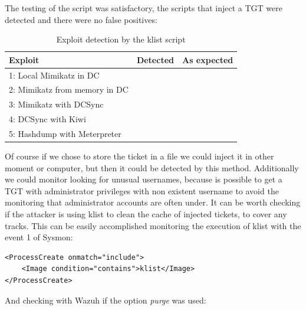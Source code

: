 \linej
\linej
The testing of the script was satisfactory, the scripts that inject a TGT were detected and there were no false positives:
\begin{table}[H]
	\centering
	\begin{tabular}{|l|l|l|}
		\hline
		\rowcolor{gray!30}
		Exploit & Detected & As expected \\ \hline
		1: Local Mimikatz in DC& \RYES& \RYES\\ \hline
		2: Mimikatz from memory in DC& \RYES& \RYES\\ \hline
		3: Mimikatz with DCSync& \RYES& \RYES\\ \hline
		4: DCSync with Kiwi& \RNO& \RYES\\ \hline
		5: Hashdump with Meterpreter& \RNO& \RYES\\ \hline
	\end{tabular}
	\caption{Exploit detection by the klist script}
\end{table}
Of course if we chose to store the ticket in a file we could inject it in other moment or computer, but then it could be detected by this method.
\linej
\linej
Additionally we could monitor looking for unusual usernames, because is possible to get a TGT with administrator privileges with non existent username to avoid the monitoring that administrator accounts are often under.
\linej
\linej
It can be worth checking if the attacker is using klist to clean the cache of injected tickets, to cover any tracks. This can be easily accomplished monitoring the execution of klist with the event 1 of Sysmon:
\begin{lstlisting}[style=xml]
<ProcessCreate onmatch="include">
	<Image condition="contains">klist</Image>
</ProcessCreate>
\end{lstlisting}
\linej
And checking with Wazuh if the option \textit{purge} was used:


